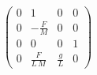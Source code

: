 \begin{equation}
\left(\begin{array}{cccc} 0 & 1 & 0 & 0\\ 0 & -\frac{F}{M} & 0 & 0\\ 0 & 0 & 0 & 1\\ 0 & \frac{F}{L\,M} & \frac{g}{L} & 0 \end{array}\right)
\end{equation}

